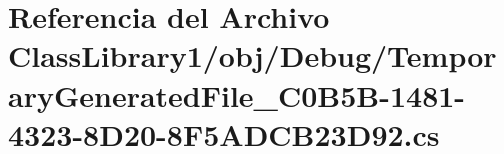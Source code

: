 \hypertarget{_class_library1_2obj_2_debug_2_temporary_generated_file__036_c0_b5_b-1481-4323-8_d20-8_f5_a_d_c_b23_d92_8cs}{}\section{Referencia del Archivo Class\+Library1/obj/\+Debug/\+Temporary\+Generated\+File\+\_\+C0\+B5\+B-\/1481-\/4323-\/8\+D20-\/8\+F5\+A\+D\+C\+B23\+D92.cs}
\label{_class_library1_2obj_2_debug_2_temporary_generated_file__036_c0_b5_b-1481-4323-8_d20-8_f5_a_d_c_b23_d92_8cs}
